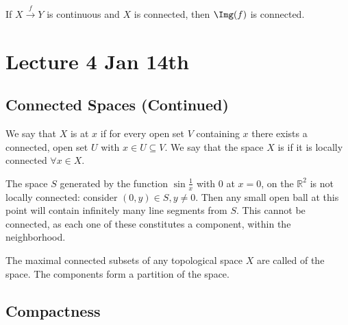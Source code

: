 \documentclass[notoc,notitlepage]{tufte-book}
\begin{document}
\begin{thm}\label{thm:from_connected_space_to_connected_space}
  If $X \overset{f}{\to} Y$ is continuous and $X$ is connected, then
  $\Img(f)$ is connected.
\end{thm}



\chapter{Lecture 4 Jan 14th}%
\label{chp:lecture_4_jan_14th}

\section{Connected Spaces (Continued)}%
\label{sec:connected_spaces_continued}

\begin{defn}\label{defn:locally_connected}
  We say that $X$ is  at $x$ if for every open set $V$
  containing $x$ there exists a connected, open set $U$ with $x \in U \subseteq V$. We say that
  the space $X$ is  if it is locally connected $\forall x \in X$.
\end{defn}

\begin{eg}
  The space $S$ generated by the function $\sin \frac{1}{x}$ with $0$ at $x = 0$,
  on the $\mathbb{R}^2$ is not locally connected: consider $(0, y) \in S, y \neq 0$.
  Then any small open ball at this point will contain infinitely many line segments from $S$.
  This cannot be connected, as each one of these constitutes a component,
  within the neighborhood.
\end{eg}

\begin{defn}\label{defn:connected_component}
  The maximal connected subsets of any topological space $X$ are called
   of the space. The components form a partition
  of the space.
\end{defn}


\section{Compactness}%
\label{sec:compactness}
\end{document}
